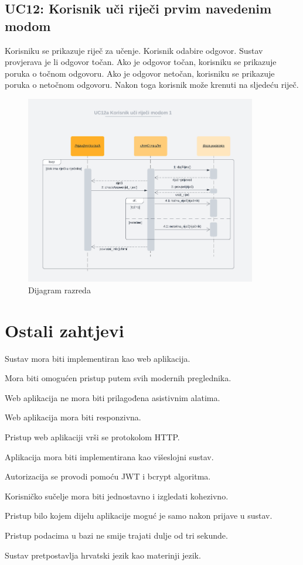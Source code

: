 				\subsection*{UC12: Korisnik uči riječi prvim navedenim modom}

				Korisniku se prikazuje riječ za učenje. Korisnik odabire odgovor. Sustav provjerava je li odgovor točan. Ako je odgovor točan, korisniku se prikazuje poruka o točnom odgovoru. Ako je odgovor netočan, korisniku se prikazuje poruka o netočnom odgovoru. Nakon toga korisnik može krenuti na sljedeću riječ.\\

				\begin{figure}[H]
					\includegraphics[width=0.9\textwidth]{dijagrami/UC12.png} 
					\centering
					\caption{Dijagram razreda}
					\label{fig:class_diagram}
				\end{figure}	
				\eject
	
		\section{Ostali zahtjevi}
		\begin{packed_item}
		\item Sustav mora biti implementiran kao web aplikacija.
		\item Mora biti omogućen pristup putem svih modernih preglednika.
		\item Web aplikacija ne mora biti prilagođena asistivnim alatima.
		\item Web aplikacija mora biti responzivna.
		\item Pristup web aplikaciji vrši se protokolom HTTP.
		\item Aplikacija mora biti implementirana kao višeslojni sustav.
		\item Autorizacija se provodi pomoću JWT i bcrypt algoritma.
		\item Korisničko sučelje mora biti jednostavno i izgledati kohezivno.
		\item Pristup bilo kojem dijelu aplikacije moguć je samo nakon prijave u sustav.
		\item Pristup podacima u bazi ne smije trajati dulje od tri sekunde.
		\item Sustav pretpostavlja hrvatski jezik kao materinji jezik.
	\end{packed_item} 
	